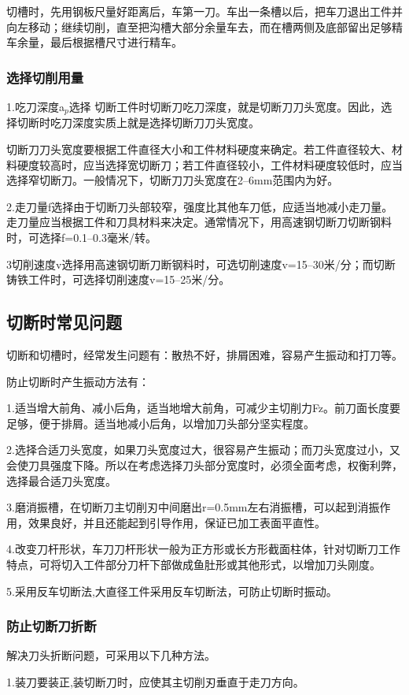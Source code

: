\documentclass{ctexbook}
\begin{document}
切槽时，先用钢板尺量好距离后，车第一刀。车出一条槽以后，把车刀退出工件并向左移动；继续切削，直至把沟槽大部分余量车去，而在槽两侧及底部留出足够精车余量，最后根据槽尺寸进行精车。
\subsubsection{选择切削用量}
1.吃刀深度a$_p$选择 切断工件时切断刀吃刀深度，就是切断刀刀头宽度。因此，选择切断时吃刀深度实质上就是选择切断刀刀头宽度。

切断刀刀头宽度要根据工件直径大小和工件材料硬度来确定。若工件直径较大、材料硬度较高时，应当选择宽切断刀；若工件直径较小，工件材料硬度较低时，应当选择窄切断刀。一般情况下，切断刀刀头宽度在2--6mm范围内为好。

2.走刀量f选择由于切断刀头部较窄，强度比其他车刀低，应适当地减小走刀量。走刀量应当根据工件和刀具材料来决定。通常情况下，用高速钢切断刀切断钢料时，可选择f=0.1--0.3毫米/转。

3切削速度v选择用高速钢切断刀断钢料时，可选切削速度v=15--30米/分；而切断铸铁工件时，可选择切削速度v=15--25米/分。
\subsection{切断时常见问题}
切断和切槽时，经常发生问题有：散热不好，排屑困难，容易产生振动和打刀等。

防止切断时产生振动方法有：

1.适当增大前角、减小后角，适当地增大前角，可减少主切削力Fz。前刀面长度要足够，便于排屑。适当地减小后角，以增加刀头部分坚实程度。

2.选择合适刀头宽度，如果刀头宽度过大，很容易产生振动；而刀头宽度过小，又会使刀具强度下降。所以在考虑选择刀头部分宽度时，必须全面考虑，权衡利弊，选择最合适刀头宽度。

3.磨消振槽，在切断刀主切削刃中间磨出r=0.5mm左右消振槽，可以起到消振作用，效果良好，并且还能起到引导作用，保证已加工表面平直性。

4.改变刀杆形状，车刀刀杆形状一般为正方形或长方形截面柱体，针对切断刀工作特点，可将切入工件部分刀杆下部做成鱼肚形或其他形式，以增加刀头刚度。

5.采用反车切断法,大直径工件采用反车切断法，可防止切断时振动。
\subsubsection{防止切断刀折断}
解决刀头折断问题，可采用以下几种方法。

1.装刀要装正,装切断刀时，应使其主切削刃垂直于走刀方向。
\end{document}
